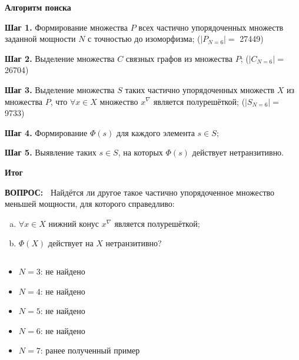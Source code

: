 \documentclass{beamer}
\newcommand{\green}{\color[rgb]{0,0.4,0}}
\newcommand{\blue}{\color{blue}}
\newcommand{\question}{%
     {\bf \green ВОПРОС:\ }}
\newcommand{\retline}{
	
$ $

}
\begin{document}
\begin{frame}
{\bf {\blue} Алгоритм поиска}

{\bf Шаг 1.}
Формирование множества $P$ всех частично упорядоченных множеств заданной мощности $N$ с точностью до изоморфизма; ($|P_{N=6}|=$ {\blue 27449})
\pause

{\bf Шаг 2.}
Выделение множества $C$ связных графов из множества $P$; ($|C_{N=6}|=$ {\blue 26704})
\pause

{\bf Шаг 3.}
Выделение множества $S$ таких частично упорядоченных множеств $X$ из множества $P$, что $\forall x \in X$ множество $x^\nabla$ является полурешёткой;  ($|S_{N=6}|=$ {\blue 9733})
\pause

{\bf Шаг 4.}
Формирование $\Phi(s)$ для каждого элемента $s \in S$;
\pause

{\bf Шаг 5.}
Выявление таких $s \in S$, на которых $\Phi(s)$  действует нетранзитивно.

\end{frame}


\begin{frame}[fragile]
{\bf Итог}

{\question}
Найдётся ли другое такое частично упорядоченное множество меньшей мощности, для которого справедливо:
\begin{enumerate}[(a)]
	\item
$\forall x \in X$ нижний конус $x^\nabla$ является полурешёткой;
	\item
$\Phi(X)$ действует на $X$ нетранзитивно?
\end{enumerate}
{\retline}

\begin{itemize}
\item
$N = 3$: не найдено
\item
$N = 4$: не найдено
\item
$N = 5$: не найдено
\item
$N = 6$: не найдено
\item
$N = 7$: ранее полученный пример
\end{itemize}
\end{frame}
\end{document}
